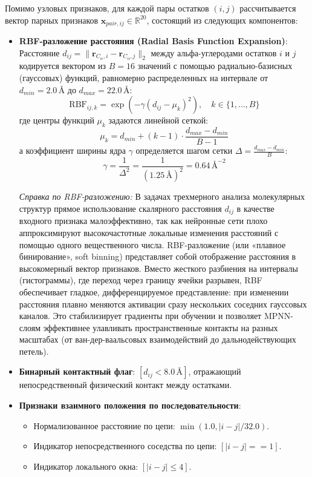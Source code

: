 \documentclass[12pt, a4paper]{article}
\begin{document}
Помимо узловых признаков, для каждой пары остатков $(i, j)$ рассчитывается вектор парных признаков $\mathbf{x}_{pair, ij} \in \mathbb{R}^{20}$, состоящий из следующих компонентов:
\begin{itemize}
    \item \textbf{RBF-разложение расстояния (Radial Basis Function Expansion)}:
    Расстояние $d_{ij} = \|\mathbf{r}_{C_\alpha, i} - \mathbf{r}_{C_\alpha, j}\|_2$ между альфа-углеродами остатков $i$ и $j$ кодируется вектором из $B=16$ значений с помощью радиально-базисных (гауссовых) функций, равномерно распределенных на интервале от $d_{min} = 2.0\,\text{\AA}$ до $d_{max} = 22.0\,\text{\AA}$:
    \begin{equation}
        \mathrm{RBF}_{ij, k} = \exp\left(-\gamma (d_{ij} - \mu_k)^2\right), \quad k \in \{1, \dots, B\}
    \end{equation}
    где центры функций $\mu_k$ задаются линейной сеткой:
    \begin{equation}
        \mu_k = d_{min} + (k - 1) \cdot \frac{d_{max} - d_{min}}{B - 1}
    \end{equation}
    а коэффициент ширины ядра $\gamma$ определяется шагом сетки $\Delta = \frac{d_{max} - d_{min}}{B}$:
    \begin{equation}
        \gamma = \frac{1}{\Delta^2} = \frac{1}{(1.25\,\text{\AA})^2} = 0.64\,\text{\AA}^{-2}
    \end{equation}
    
    \textit{Справка по RBF-разложению:} В задачах трехмерного анализа молекулярных структур прямое использование скалярного расстояния $d_{ij}$ в качестве входного признака малоэффективно, так как нейронные сети плохо аппроксимируют высокочастотные локальные изменения расстояний с помощью одного вещественного числа. RBF-разложение (или «плавное бинирование», soft binning) представляет собой отображение расстояния в высокомерный вектор признаков. Вместо жесткого разбиения на интервалы (гистограммы), где переход через границу ячейки разрывен, RBF обеспечивает гладкое, дифференцируемое представление: при изменении расстояния плавно меняются активации сразу нескольких соседних гауссовых каналов. Это стабилизирует градиенты при обучении и позволяет MPNN-слоям эффективнее улавливать пространственные контакты на разных масштабах (от ван-дер-ваальсовых взаимодействий до дальнодействующих петель).
    
    \item \textbf{Бинарный контактный флаг}: $[d_{ij} < 8.0\,\text{\AA}]$, отражающий непосредственный физический контакт между остатками.
    \item \textbf{Признаки взаимного положения по последовательности}:
    \begin{itemize}
        \item Нормализованное расстояние по цепи: $\min(1.0, |i-j| / 32.0)$.
        \item Индикатор непосредственного соседства по цепи: $[|i-j| == 1]$.
        \item Индикатор локального окна: $[|i-j| \le 4]$.
    \end{itemize}
\end{itemize}
\end{document}

